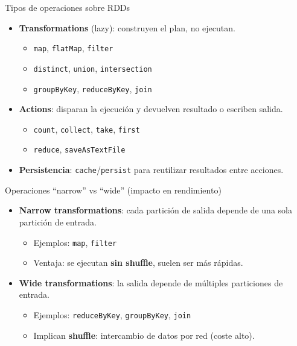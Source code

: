 \documentclass{beamer}
\begin{document}
\begin{frame}{Tipos de operaciones sobre RDDs}
\begin{itemize}
  \item \textbf{Transformations} (lazy): construyen el plan, no ejecutan.
  \begin{itemize}
    \item \texttt{map}, \texttt{flatMap}, \texttt{filter}
    \item \texttt{distinct}, \texttt{union}, \texttt{intersection}
    \item \texttt{groupByKey}, \texttt{reduceByKey}, \texttt{join}
  \end{itemize}
  \item \textbf{Actions}: disparan la ejecución y devuelven resultado o escriben salida.
  \begin{itemize}
    \item \texttt{count}, \texttt{collect}, \texttt{take}, \texttt{first}
    \item \texttt{reduce}, \texttt{saveAsTextFile}
  \end{itemize}
  \item \textbf{Persistencia}: \texttt{cache}/\texttt{persist} para reutilizar resultados entre acciones.
\end{itemize}
\end{frame}

\begin{frame}{Operaciones ``narrow'' vs ``wide'' (impacto en rendimiento)}
\begin{itemize}
  \item \textbf{Narrow transformations}: cada partición de salida depende de una sola partición de entrada.
  \begin{itemize}
    \item Ejemplos: \texttt{map}, \texttt{filter}
    \item Ventaja: se ejecutan \textbf{sin shuffle}, suelen ser más rápidas.
  \end{itemize}
  \item \textbf{Wide transformations}: la salida depende de múltiples particiones de entrada.
  \begin{itemize}
    \item Ejemplos: \texttt{reduceByKey}, \texttt{groupByKey}, \texttt{join}
    \item Implican \textbf{shuffle}: intercambio de datos por red (coste alto).
  \end{itemize}
\end{itemize}
\end{frame}
\end{document}
